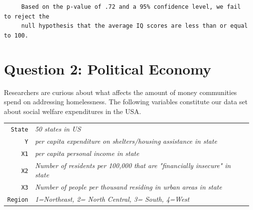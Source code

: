 \documentclass[12pt,letterpaper]{article}
\begin{document}
\begin{verbatim}
	 Based on the p-value of .72 and a 95% confidence level, we fail to reject the
	 null hypothesis that the average IQ scores are less than or equal to 100. 
\end{verbatim}
	

\newpage

	\section*{Question 2: Political Economy}

\noindent Researchers are curious about what affects the amount of money communities spend on addressing homelessness. The following variables constitute our data set about social welfare expenditures in the USA. \\
\vspace{.5cm}


\begin{tabular}{r|l}
	\texttt{State} &\emph{50 states in US} \\
	\texttt{Y} & \emph{per capita expenditure on shelters/housing assistance in state}\\
	\texttt{X1} &\emph{per capita personal income in state} \\
	\texttt{X2} &  \emph{Number of residents per 100,000 that are "financially insecure" in state}\\
	\texttt{X3} &  \emph{Number of people per thousand residing in urban areas in state} \\
	\texttt{Region} &  \emph{1=Northeast, 2= North Central, 3= South, 4=West} \\
\end{tabular}
\end{document}
